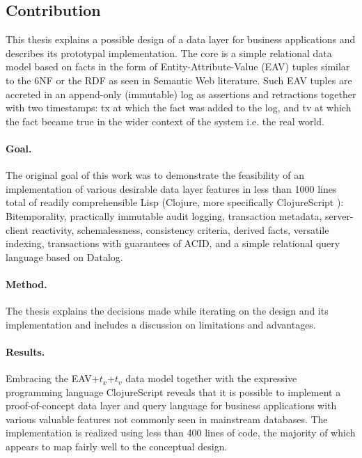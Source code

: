 \subsection{Contribution}
This thesis explains a possible design of a data layer for business applications and describes its prototypal implementation. The core is a simple relational data model based on facts in the form of Entity-Attribute-Value (EAV) tuples similar to the \gls{6NF} or the \gls{RDF} as seen in Semantic Web literature. Such EAV tuples are accreted in an append-only (immutable) log as assertions and retractions together with two timestamps: \gls{tx} at which the fact was added to the log, and \gls{tv} at which the fact became true in the wider context of the system \cite{snodgrass1992temporal} i.e. the real world.


\paragraph{Goal.}
The original goal of this work was to demonstrate the feasibility of an implementation of various desirable data layer features in less than 1000 lines total of readily comprehensible Lisp (Clojure, more specifically ClojureScript \cite{hickey2008clojure}): Bitemporality, practically immutable audit logging, transaction metadata, server-client reactivity, schemalessness, consistency criteria, derived facts, versatile indexing, transactions with guarantees of \gls{ACID}, and a simple relational query language based on Datalog.

\paragraph{Method.}
The thesis explains the decisions made while iterating on the design and its implementation and includes a discussion on limitations and advantages.

\paragraph{Results.}
Embracing the EAV+$t_x$+$t_v$ data model together with the expressive programming language ClojureScript reveals that it is possible to implement a proof-of-concept data layer and query language for business applications with various valuable features not commonly seen in mainstream databases. The implementation is realized using less than 400 lines of code, the majority of which appears to map fairly well to the conceptual design.
